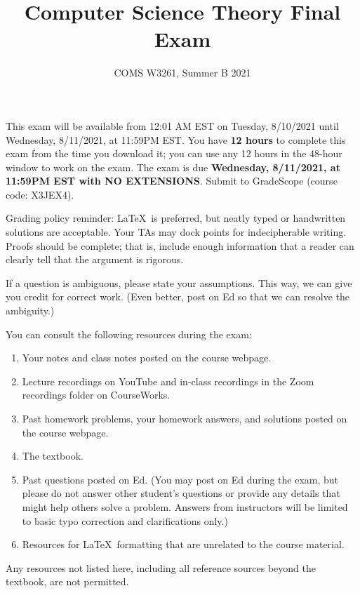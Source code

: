 \documentclass[letterpaper,11pt,twoside]{article}
\title{Computer Science Theory Final Exam}
\date{COMS W3261, Summer B 2021}
\theoremstyle{plain}
\theoremstyle{definition}
\theoremstyle{remark}
\theoremstyle{restate}
\begin{document}
\maketitle

This exam will be available from 12:01 AM EST on Tuesday, 8/10/2021 until Wednesday, 8/11/2021, at 11:59PM EST. You have \textbf{12 hours} to complete this exam from the time you download it; you can use any 12 hours in the 48-hour window to work on the exam. The exam is due \textbf{Wednesday, 8/11/2021, at 11:59PM EST with NO EXTENSIONS}. Submit to GradeScope (course code: X3JEX4). 

Grading policy reminder: \LaTeX~is preferred, but neatly typed or handwritten solutions are acceptable. Your TAs may dock points for indecipherable writing. Proofs should be complete; that is, include enough information that a reader can clearly tell that the argument is rigorous.

If a question is ambiguous, please state your assumptions. This way, we can give you credit for correct work. (Even better, post on Ed so that we can resolve the ambiguity.)

You can consult the following resources during the exam:
\begin{enumerate}
    \item Your notes and class notes posted on the course webpage.
    \item Lecture recordings on YouTube and in-class recordings in the Zoom recordings folder on CourseWorks.
    \item Past homework problems, your homework answers, and solutions posted on the course webpage.
    \item The textbook.
    \item Past questions posted on Ed. (You may post on Ed during the exam, but please do not answer other student's questions or provide any details that might help others solve a problem. Answers from instructors will be limited to basic typo correction and clarifications only.)
    \item Resources for \LaTeX~formatting that are unrelated to the course material.
\end{enumerate}
Any resources not listed here, including all reference sources beyond the textbook, are not permitted.

\clearpage
\end{document}

